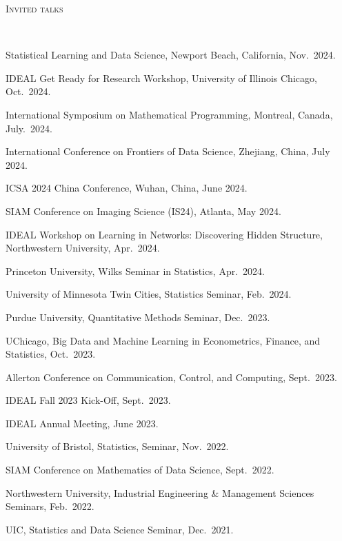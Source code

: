 \documentclass[a4paper, 10pt]{article}
\newenvironment{changemargin}[2]{%
  \begin{list}{}{%
    \setlength{\topsep}{0pt}%
    \setlength{\leftmargin}{#1}%
    \setlength{\rightmargin}{#2}%
    \setlength{\listparindent}{\parindent}%
    \setlength{\itemindent}{\parindent}%
    \setlength{\parsep}{\parskip}%
  }%
  \item[]}{\end{list}
}
\newcommand{\lineover}{
	\begin{changemargin}{-0.05in}{-0.05in}
		\vspace*{-8pt}
		\hrulefill \\
		\vspace*{-2pt}
	\end{changemargin}
}
\newcommand{\header}[1]{
	\begin{changemargin}{-0.5in}{-0.5in}
		\scshape{#1}\\
  	\lineover
	\end{changemargin}
}
\newenvironment{body} {
	\vspace*{-16pt}
	\begin{changemargin}{-0.3in}{-0.5in}
  }	
	{\end{changemargin}
}
\begin{document}
\bigskip
\header{\LARGE{Invited talks}}
\begin{body}
	\vspace{18pt}
	\begin{enumerate}[label={[{T}{{\arabic*}}]}]
	
	\item Statistical Learning and Data Science, Newport Beach, California, Nov.~2024.
	\item IDEAL Get Ready for Research Workshop, University of Illinois Chicago, Oct.~2024.
	\item International Symposium on Mathematical Programming, Montreal, Canada, July.~2024.
	\item International Conference on Frontiers of Data Science, Zhejiang, China, July 2024.
	\item ICSA 2024 China Conference, Wuhan, China, June 2024.

	\item SIAM Conference on Imaging Science (IS24), Atlanta, May 2024.

	\item IDEAL Workshop on Learning in Networks: Discovering Hidden Structure, Northwestern University, Apr.~2024.
	\item Princeton University, Wilks Seminar in Statistics, Apr.~2024.
	
	\item University of Minnesota Twin Cities, Statistics Seminar, Feb.~2024.
	\item Purdue University, Quantitative Methods Seminar, Dec.~2023.
	\item UChicago, Big Data and Machine Learning in Econometrics, Finance, and Statistics, Oct.~2023.
	\item Allerton Conference on Communication, Control, and Computing, Sept.~2023.
	
	\item IDEAL Fall 2023 Kick-Off, Sept.~2023.
	
	\item IDEAL Annual Meeting, June 2023.
	\item University of Bristol, Statistics, Seminar, Nov.~2022. 
	
	\item SIAM Conference on Mathematics of Data Science, Sept.~2022.
	
	\item Northwestern University, Industrial Engineering \& Management Sciences Seminars, Feb.~2022.
	
	\item UIC, Statistics and Data Science Seminar, Dec.~2021. 
	

\end{enumerate}
\end{body}
\end{document}
